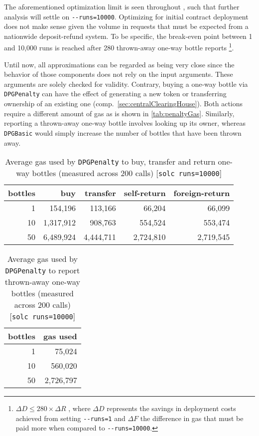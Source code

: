 \begin{appendices}
\FloatBarrier

The aforementioned optimization limit is seen throughout , such that further analysis will settle on \texttt{-{}-runs=10000}. Optimizing for initial contract deployment does not make sense given the volume in requests that must be expected from a nationwide deposit-refund system. To be specific, the break-even point between 1 and 10,000 runs is reached after 280 thrown-away one-way bottle reports \footnote{$ \Delta D \leq 280 \times \Delta R$ , where $\Delta D$ represents the savings in deployment costs achieved from setting \texttt{-{}-runs=1} and $\Delta F$ the difference in gas that must be paid more when compared to \texttt{-{}-runs=10000}.}. 

Until now, all approximations can be regarded as being very close since the behavior of those components does not rely on the input arguments. These arguments are solely checked for validity. Contrary, buying a one-way bottle via \texttt{DPGPenalty} can have the effect of generating a new token or transferring ownership of an existing one (comp.~\ref{sec:centralClearingHouse}). Both actions require a different amount of gas as is shown in \autoref{tab:penaltyGas}. Similarly, reporting a thrown-away one-way bottle involves looking up its owner, whereas \texttt{DPGBasic} would simply increase the number of bottles that have been thrown away.

\begin{table}[hbt]
	\centering	
	\begin{tabular}{r|r|r|r|r}
    	bottles & buy & transfer & self-return & foreign-return \\
    	\hline
    	1 & 154,196 & 113,166 & 66,204 & 66,099 \\
    	10 & 1,317,912 & 908,763 & 554,524 & 553,474 \\ 
    	50 & 6,489,924 & 4,444,711 & 2,724,810 & 2,719,545 \\
	\end{tabular}
	\caption[Average gas used to buy, transfer and return one-way bottles]{Average gas used by \texttt{DPGPenalty} to buy, transfer and return one-way bottles (measured across 200 calls) [\texttt{solc runs=10000}]}
	\label{tab:penaltyGas}
\end{table}

\begin{table}[hbt]
	\centering	
	\begin{tabular}{r|r}
    	bottles & gas used \\
    	\hline
    	1 & 75,024 \\
    	10 & 560,020 \\ 
    	50 & 2,726,797 \\
	\end{tabular}
	\caption[Average gas used to buy, transfer and return one-way bottles]{Average gas used by \texttt{DPGPenalty} to report thrown-away one-way bottles (measured across 200 calls) [\texttt{solc runs=10000}]}
	\label{tab:penaltyGas}
\end{table}


\end{appendices}
